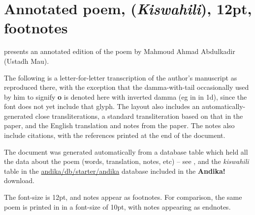 \chapter{Annotated poem,  (\textit{Kiswahili}), 12pt, footnotes}
\renewcommand{\thesection}{D/\arabic{section}}  %
\setcounter{section}{0}  %
\label{appD}

\citet{Abdulkadir2013} presents an annotated edition of the poem  by Mahmoud Ahmad Abdulkadir (Ustadh Mau).

The following is a letter-for-letter transcription of the author's manuscript as reproduced there, with the exception that the damma-with-tail occasionally used by him to signify \textbf{o} is denoted here with inverted damma (eg in  in 1d), since the font does not yet include that glyph.  The layout also includes an automatically-generated close transliterations, a standard transliteration based on that in the paper, and the English translation and notes from the paper.  The notes also include citations, with the references printed at the end of the document.

The document was generated automatically from a database table which held all the data about the poem (words, translation, notes, etc) -- see , and the \textit{kiswahili} table in the \url{andika/db/starter/andika} database included in the \textbf{Andika!} download.

The font-size is 12pt, and notes appear as footnotes.  For comparison, the same poem is printed in  in a font-size of 10pt, with notes appearing as endnotes.



